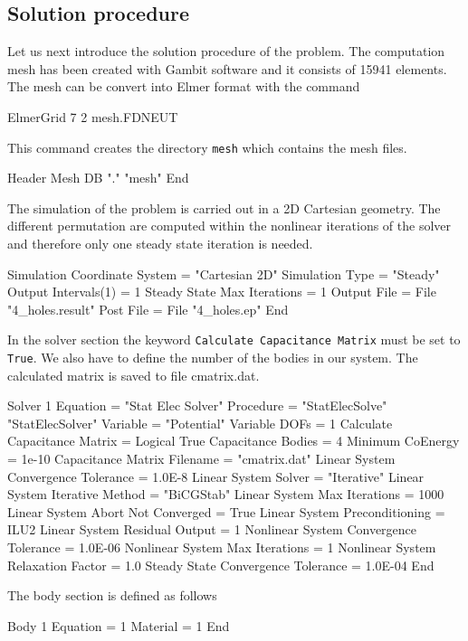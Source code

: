 \subsection*{Solution procedure}

\begin{flushleft}
Let us next introduce the solution procedure of the problem.
The computation mesh has been created with Gambit software and it consists of 15941 elements. The mesh can be convert into Elmer format with the command

\ttbegin
ElmerGrid 7 2 mesh.FDNEUT
\ttend

This command creates the directory {\tt mesh} which contains the mesh files. 

\ttbegin
Header
  Mesh DB "." "mesh"
End
\ttend

The simulation of the problem is carried out in a 2D Cartesian geometry.
The different permutation are computed within the nonlinear iterations of the solver and therefore only one
steady state iteration is needed.

\ttbegin
Simulation
  Coordinate System = "Cartesian 2D"
  Simulation Type = "Steady"
  Output Intervals(1) = 1 
  Steady State Max Iterations = 1
  Output File = File "4_holes.result"
  Post File =   File "4_holes.ep"
End
\ttend

In the solver section the keyword {\tt Calculate Capacitance Matrix} must be set to {\tt True}. 
We also have to define the number of the bodies in our system. 
The calculated matrix is saved to file cmatrix.dat.

\ttbegin
Solver 1
  Equation = "Stat Elec Solver"
  Procedure = "StatElecSolve" "StatElecSolver"
  Variable = "Potential"
  Variable DOFs = 1
  Calculate Capacitance Matrix = Logical True
  Capacitance Bodies = 4
  Minimum CoEnergy = 1e-10
  Capacitance Matrix Filename = "cmatrix.dat"
  Linear System Convergence Tolerance = 1.0E-8
  Linear System Solver = "Iterative"
  Linear System Iterative Method = "BiCGStab"
  Linear System Max Iterations = 1000
  Linear System Abort Not Converged = True
  Linear System Preconditioning = ILU2
  Linear System Residual Output = 1
  Nonlinear System Convergence Tolerance =  1.0E-06
  Nonlinear System Max Iterations = 1
  Nonlinear System Relaxation Factor = 1.0
  Steady State Convergence Tolerance =  1.0E-04
End
\ttend

The body section is defined as follows

\ttbegin
Body 1
  Equation = 1
  Material = 1
End
\ttend                                      


\end{flushleft}
